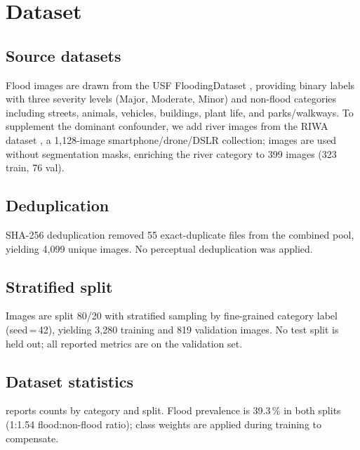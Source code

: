 \documentclass[a4paper,fleqn]{cas-sc}
\begin{document}
\section{Dataset}
\label{sec:dataset}

\subsection{Source datasets}
\label{sec:dataset:sources}

Flood images are drawn from the USF FloodingDataset \cite{FloodingDataset}, providing binary labels
with three severity levels (Major, Moderate, Minor) and non-flood categories including streets,
animals, vehicles, buildings, plant life, and parks/walkways.
To supplement the dominant confounder, we add river images from the RIWA dataset \cite{Wagner2023},
a 1,128-image smartphone/drone/DSLR collection; images are used without segmentation masks,
enriching the river category to 399 images (323 train, 76 val).

\subsection{Deduplication}
\label{sec:dataset:dedup}

SHA-256 deduplication removed 55 exact-duplicate files from the combined pool, yielding 4,099 unique images.
No perceptual deduplication was applied.

\subsection{Stratified split}
\label{sec:dataset:split}

Images are split 80/20 with stratified sampling by fine-grained category label (seed\,=\,42),
yielding 3,280 training and 819 validation images.
No test split is held out; all reported metrics are on the validation set.

\subsection{Dataset statistics}
\label{sec:dataset:stats}

 reports counts by category and split.
Flood prevalence is 39.3\,\% in both splits (1:1.54 flood:non-flood ratio);
class weights are applied during training to compensate.
\end{document}
